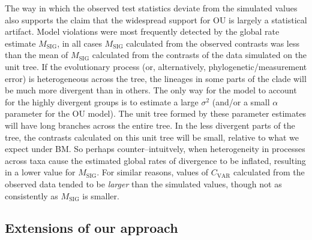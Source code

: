 \documentclass[a4paper,11pt]{article}
\begin{document}
The way in which the observed test statistics deviate from the simulated values also supports the claim that the widespread support for OU is largely a statistical artifact. 
Model violations were most frequently detected by the global rate estimate $M_{\text{SIG}}$, in all cases $M_{\text{SIG}}$ calculated from the observed contrasts was less than the mean of $M_{\text{SIG}}$ calculated from the contrasts of the data simulated on the unit tree. If the evolutionary process (or, alternatively, phylogenetic/measurement error) is heterogeneous across the tree, the lineages in some parts of the clade will be much more divergent than in others. The only way for the model to account for the highly divergent groups is to estimate a large $\sigma^2$ (and/or a small $\alpha$ parameter for the OU model). The unit tree formed by these parameter estimates will have long branches across the entire tree. In the less divergent parts of the tree, the contrasts calculated on this unit tree will be small, relative to what we expect under BM. So perhaps counter--intuitvely, when heterogeneity in processes across taxa cause the estimated global rates of divergence to be inflated, resulting in a lower value for $M_{\text{SIG}}$. For similar reasons, values of $C_{\text{VAR}}$ calculated from the observed data tended to be \emph{larger} than the simulated values, though not as consistently as $M_{\text{SIG}}$ is smaller. 


\subsection{Extensions of our approach}
\end{document}
